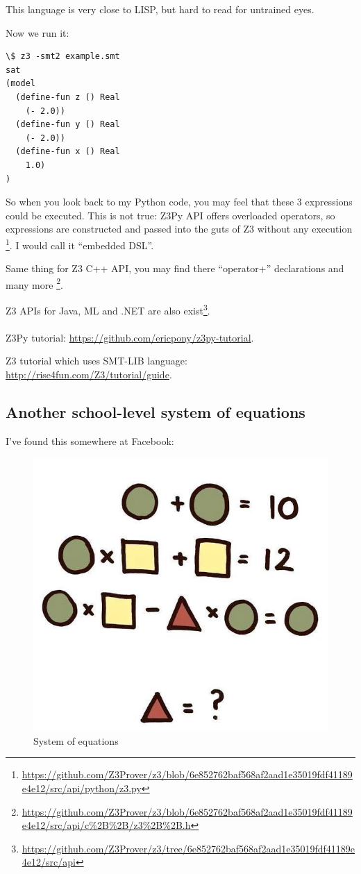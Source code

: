 This language is very close to LISP, but hard to read for untrained eyes.

Now we run it:

\begin{lstlisting}
\$ z3 -smt2 example.smt
sat
(model
  (define-fun z () Real
    (- 2.0))
  (define-fun y () Real
    (- 2.0))
  (define-fun x () Real
    1.0)
)
\end{lstlisting}

So when you look back to my Python code, you may feel that these 3 expressions could be executed.
This is not true: Z3Py API offers overloaded operators, so expressions are constructed and passed into the guts of Z3 without any execution
\footnote{\url{https://github.com/Z3Prover/z3/blob/6e852762baf568af2aad1e35019fdf41189e4e12/src/api/python/z3.py}}.
I would call it ``embedded \ac{DSL}''.

Same thing for Z3 C++ API, you may find there ``operator+'' declarations and many more
\footnote{\url{https://github.com/Z3Prover/z3/blob/6e852762baf568af2aad1e35019fdf41189e4e12/src/api/c\%2B\%2B/z3\%2B\%2B.h}}.

Z3 APIs for Java, ML and .NET are also exist\footnote{\url{https://github.com/Z3Prover/z3/tree/6e852762baf568af2aad1e35019fdf41189e4e12/src/api}}.\\
\\
Z3Py tutorial: \url{https://github.com/ericpony/z3py-tutorial}.

Z3 tutorial which uses SMT-LIB language: \url{http://rise4fun.com/Z3/tutorial/guide}.

\subsection{Another school-level system of equations}

I've found this somewhere at Facebook:

\begin{figure}[H]
\centering
\includegraphics[scale=0.3]{SMT/equation.jpg}
\caption{System of equations}
\end{figure}

